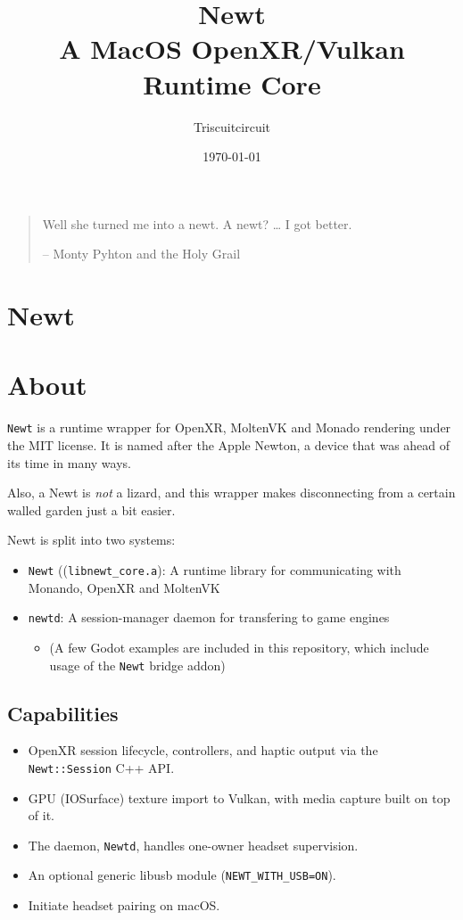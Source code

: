 \documentclass[11pt]{article}
\author{Triscuitcircuit}
\date{\today}
\title{Newt\\\medskip
\large A MacOS OpenXR/Vulkan Runtime Core}
\begin{document}
\maketitle
\tableofcontents

\clearpage
\begin{quote}
Well she turned me into a newt.
A newt?
\ldots{} I got better.

-- Monty Pyhton and the Holy Grail
\end{quote}
\section{Newt}
\label{sec:org7f16d57}
\section{About}
\label{sec:orgd98eb26}
\texttt{Newt} is a runtime wrapper for OpenXR, MoltenVK and Monado rendering under the MIT license.
It is named after the Apple Newton, a device that was ahead of its time in many ways.

Also, a Newt is \emph{not} a lizard, and this wrapper makes disconnecting from a certain walled garden just a bit easier.

Newt is split into two systems:
\begin{itemize}
\item \texttt{Newt} ((\texttt{libnewt\_core.a}): A runtime library for communicating with Monando, OpenXR and MoltenVK
\item \texttt{newtd}: A session-manager daemon for transfering to game engines
\begin{itemize}
\item (A few Godot examples are included in this repository, which include usage of the \texttt{Newt} bridge addon)
\end{itemize}
\end{itemize}
\subsection{Capabilities}
\label{sec:org99c01cb}
\begin{itemize}
\item OpenXR session lifecycle, controllers, and haptic output via the \texttt{Newt::Session} C++ API.
\item GPU (IOSurface) texture import to Vulkan, with media capture built on top of it.
\item The daemon, \texttt{Newtd}, handles one-owner headset supervision.
\item An optional generic libusb module (\texttt{NEWT\_WITH\_USB=ON}).
\item Initiate headset pairing on macOS.
\end{itemize}
\end{document}
